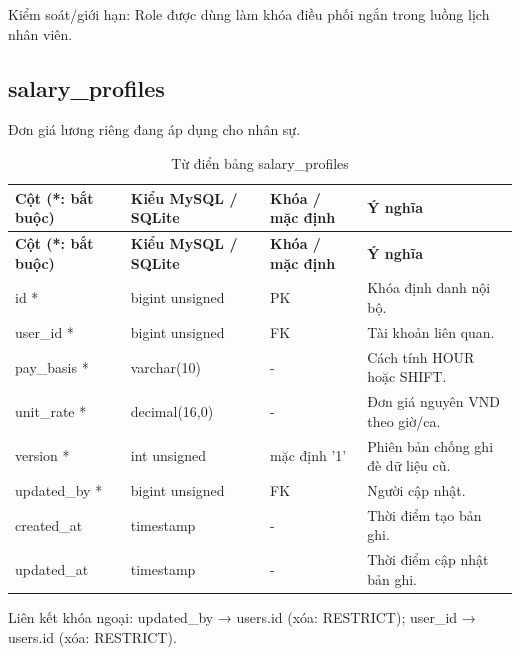 Kiểm soát/\allowbreak{}giới hạn:\allowbreak{} Role được dùng làm khóa điều phối ngắn trong luồng lịch nhân viên.\allowbreak{}

\clearpage

\subsection{salary\_\allowbreak{}profiles}
Đơn giá lương riêng đang áp dụng cho nhân sự.\allowbreak{}


{\fontsize{10}{12}\selectfont\setlength{\tabcolsep}{3pt}\renewcommand{\arraystretch}{1.12}
\begin{longtable}{@{}L{\textwidth-4.86pt\relax} L{\textwidth-3.96pt\relax} L{\textwidth-2.88pt\relax} L{\textwidth-6.3pt\relax}@{}}
\caption{Từ điển bảng salary\_\allowbreak{}profiles}\\
\toprule
\textbf{Cột (*:\allowbreak{} bắt buộc)} & \textbf{Kiểu My\allowbreak{}SQL /\allowbreak{} SQLite} & \textbf{Khóa /\allowbreak{} mặc định} & \textbf{Ý nghĩa}\\\midrule
\endfirsthead
\toprule
\textbf{Cột (*:\allowbreak{} bắt buộc)} & \textbf{Kiểu My\allowbreak{}SQL /\allowbreak{} SQLite} & \textbf{Khóa /\allowbreak{} mặc định} & \textbf{Ý nghĩa}\\\midrule
\endhead
\bottomrule\endlastfoot
id * & bigint unsigned & PK & Khóa định danh nội bộ.\allowbreak{}\\[1pt]
user\_\allowbreak{}id * & bigint unsigned & FK & Tài khoản liên quan.\allowbreak{}\\[1pt]
pay\_\allowbreak{}basis * & varchar(10) & - & Cách tính HOUR hoặc SHIFT.\allowbreak{}\\[1pt]
unit\_\allowbreak{}rate * & decimal(16,0) & - & Đơn giá nguyên VND theo giờ/\allowbreak{}ca.\allowbreak{}\\[1pt]
version * & int unsigned & mặc định '1' & Phiên bản chống ghi đè dữ liệu cũ.\allowbreak{}\\[1pt]
updated\_\allowbreak{}by * & bigint unsigned & FK & Người cập nhật.\allowbreak{}\\[1pt]
created\_\allowbreak{}at & timestamp & - & Thời điểm tạo bản ghi.\allowbreak{}\\[1pt]
updated\_\allowbreak{}at & timestamp & - & Thời điểm cập nhật bản ghi.\allowbreak{}\\[1pt]
\end{longtable}}
Liên kết khóa ngoại:\allowbreak{} updated\_\allowbreak{}by → users.\allowbreak{}id (xóa:\allowbreak{} RESTRICT); user\_\allowbreak{}id → users.\allowbreak{}id (xóa:\allowbreak{} RESTRICT).\allowbreak{}

